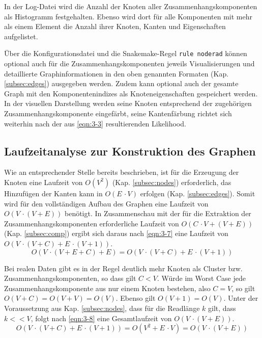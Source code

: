 In der Log-Datei wird die Anzahl der Knoten aller Zusammenhangskomponenten als Histogramm festgehalten. Ebenso wird dort für alle Komponenten mit mehr als einem Element die Anzahl ihrer Knoten, Kanten und Eigenschaften aufgelistet.

Über die Konfigurationsdatei und die Snakemake-Regel \lstinline|rule noderad| können optional auch für die Zusammenhangskomponenten jeweils Visualisierungen und detaillierte Graphinformationen in den oben genannten Formaten (Kap. \ref{subsec:edges}) ausgegeben werden. Zudem kann optional auch der gesamte Graph mit den Komponentenindizes als Knoteneigenschaften gespeichert werden. In der visuellen Darstellung werden seine Knoten entsprechend der zugehörigen Zusammenhangskomponente eingefärbt, seine Kantenfärbung richtet sich weiterhin nach der aus \eqref{eqn:3-3} resultierenden Likelihood.

\subsection{Laufzeitanalyse zur Konstruktion des Graphen} \label{subsec:runtime_graph}
Wie an entsprechender Stelle bereits beschrieben, ist für die Erzeugung der Knoten eine Laufzeit von $ O(V^2) $ (Kap. \ref{subsec:nodes}) erforderlich, das Hinzufügen der Kanten kann in $ O(E\, \cdotp V) $ erfolgen (Kap. \ref{subsec:edges}). Somit wird für den vollständigen Aufbau des Graphen eine Laufzeit von $ O(V \, \cdotp (V+E)) $ benötigt. In Zusammenschau mit der für die Extraktion der Zusammenhangskomponenten erforderliche Laufzeit von $ O(C \, \cdotp V + (V + E)) $ (Kap. \ref{subsec:comp}) ergibt sich daraus nach  \eqref{eqn:3-7} eine Laufzeit von $ O(V \, \cdotp (V + C) + E \, \cdotp (V + 1)) $. 
\begin{equation} \label{eqn:3-7}
\tag{3-7}
O(V \, \cdotp (V + E + C) + E) = O(V \, \cdotp (V + C) + E \, \cdotp (V + 1))
\end{equation}

Bei realen Daten gibt es in der Regel deutlich mehr Knoten als Cluster bzw. Zusammenhangskomponenten, so dass gilt $ C < V $. Würde im Worst Case jede Zusammenhangskomponente aus nur einem Knoten bestehen, also $ C = V $, so gilt $ O(V + C) = O(V + V) = O(V) $. Ebenso gilt $ O(V + 1) = O(V) $. Unter der Voraussetzung aus Kap. \ref{subsec:nodes}, dass für die Readlänge $ k $ gilt, dass $ k << V $, folgt nach  \eqref{eqn:3-8} eine Gesamtlaufzeit von $ O(V \, \cdotp (V + E)) $.
\begin{equation} \label{eqn:3-8}
\tag{3-8}
O(V \, \cdotp (V + C) + E \, \cdotp (V + 1)) = O (V^2 + E \, \cdotp V) = O(V \, \cdotp (V + E))
\end{equation}

